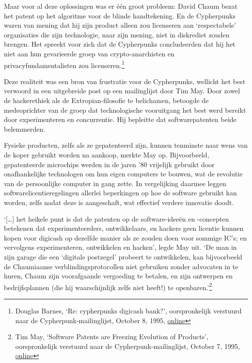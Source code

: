 \documentclass[
  a5paper,
  smalldemyvopaper,11pt,twoside,onecolumn,openright,extrafontsizes,
hidelinks]{memoir}
\begin{document}
Maar voor al deze oplossingen was er één groot probleem: David Chaum
bezat het patent op het algoritme voor de blinde handtekening. En de
Cypherpunks waren van mening dat hij zijn product alleen zou licenseren
aan `respectabele' organisaties die zijn technologie, naar zijn mening,
niet in diskrediet zouden brengen. Het spreekt voor zich dat de
Cypherpunks concludeerden dat hij het niet aan hun gevarieerde groep van
crypto-anarchisten en privacyfundamentalisten zou licenseren.\footnote{Douglas
  Barnes, `Re: cypherpunks digicash bank?', oorspronkelijk verstuurd
  naar de Cypherpunk-mailinglijst, October 8, 1995,
  \href{https://cypherpunks.venona.com/date/1995/10/msg00731.html}{online}}

Deze realiteit was een bron van frustratie voor de Cypherpunks, wellicht
het best verwoord in een uitgebreide post op een mailinglijst door Tim
May. Door zowel de hackerethiek als de Extropian-filosofie te
belichamen, betoogde de medeoprichter van de groep dat technologische
vooruitgang het best werd bereikt door experimenteren en concurrentie.
Hij bepleitte dat softwarepatenten beide belemmerden.

Fysieke producten, zelfs als ze gepatenteerd zijn, kunnen tenminste naar
wens van de koper gebruikt worden na aankoop, merkte May op.
Bijvoorbeeld, gepatenteerde microchips werden in de jaren '80 vrijelijk
gebruikt door onafhankelijke technologen om hun eigen computers te
bouwen, wat de revolutie van de persoonlijke computer in gang zette. In
vergelijking daarmee leggen softwarelicentieregelingen allerlei
beperkingen op hoe de software gebruikt kan worden, zelfs nadat deze is
aangeschaft, wat effectief verdere innovatie doodt.

`{[}\ldots{]} het heikele punt is dat de patenten op de software-ideeën
en -concepten betekenen dat experimenteerders, ontwikkelaars, en hackers
geen licentie kunnen kopen voor digicash op dezelfde manier als ze
zouden doen voor sommige IC's; en vervolgens experimenteren, ontwikkelen
en hacken', legde May uit. `De man in zijn garage die een `digitale
postzegel' probeert te ontwikkelen, kan bijvoorbeeld de Chaumiaanse
verblindingsprotocollen niet gebruiken zonder advocaten in te huren,
Chaum zijn voorafgaande vergoeding te betalen, en zijn ontwerpen en
bedrijfsplannen (die hij waarschijnlijk zelfs niet heeft!) te
openbaren.'\footnote{Tim May, `Software Patents are Freezing Evolution
  of Products', oorspronkelijk verstuurd naar de
  Cypherpunk-mailinglijst, October 7, 1995,
  \href{https://cypherpunks.venona.com/date/1995/10/msg00685.html}{online}}
\end{document}
